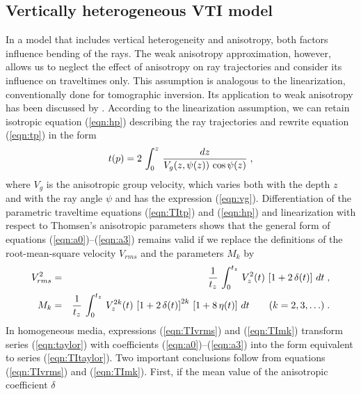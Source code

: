 \subsection{Vertically heterogeneous VTI model} 
In a model that includes vertical heterogeneity and anisotropy, both
factors influence bending of the rays. The weak anisotropy
approximation, however, allows us to neglect the effect of anisotropy on ray
trajectories and consider its influence on traveltimes only. This
assumption is analogous to the linearization, conventionally done for
tomographic inversion. Its application to weak anisotropy has been
discussed by \cite{GEO61-06-18831894}. According to the
linearization assumption, we can retain isotropic equation
(\ref{eqn:hp}) describing the ray trajectories and rewrite equation
(\ref{eqn:tp}) in the form
\begin{equation}
t(p) = 2\,\int_{0}^{z}\,{{dz} \over {V_g(z,\psi(z))\,\cos{\psi(z)}}}\;,
\label{eqn:TItp} 
\end{equation}
where $V_g$ is the anisotropic group velocity, which varies both with the
depth $z$ and with the ray angle $\psi$ and has the expression
(\ref{eqn:vg}). Differentiation of the parametric traveltime equations
(\ref{eqn:TItp}) and (\ref{eqn:hp}) and linearization with respect to Thomsen's
anisotropic parameters shows that the general form of equations
(\ref{eqn:a0})--(\ref{eqn:a3}) remains valid if we replace the definitions 
of the root-mean-square velocity $V_{rms}$ and the parameters $M_k$ 
by 
\begin{eqnarray}
V_{rms}^2 & = & {1 \over t_z}\,\int_{0}^{t_z}\,V_z^{2}(t)\,
\left[1 + 2\,\delta(t)\right]\,dt\;,
\label{eqn:TIvrms} \\
M_k & = & {1 \over t_z}\,\int_{0}^{t_z}\,V_z^{2k}(t)\,
\left[1 + 2\,\delta(t)\right]^{2k}\,\left[1 + 8\,\eta(t)\right]\,dt \qquad 
(k = 2,3, \ldots)\;.
\label{eqn:TImk} 
\end{eqnarray}
In homogeneous media, expressions (\ref{eqn:TIvrms}) 
and (\ref{eqn:TImk}) transform series (\ref{eqn:taylor}) with
coefficients (\ref{eqn:a0})--(\ref{eqn:a3}) into the form equivalent to
series (\ref{eqn:TItaylor}). Two important conclusions follow from 
equations (\ref{eqn:TIvrms}) and (\ref{eqn:TImk}). 
First, if the mean value of the anisotropic coefficient $\delta$ 
